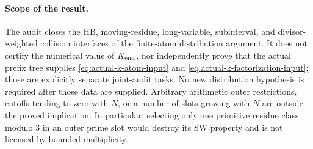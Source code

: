 \paragraph{Scope of the result.}
The audit closes the HB, moving-residue, long-variable, subinterval,
and divisor-weighted collision interfaces of the finite-atom
distribution argument. It does not certify the numerical value of
$K_{\rm end}$, nor independently prove that the actual prefix tree
supplies \eqref{eq:actual-k-atom-input} and
\eqref{eq:actual-k-factorization-input}; those are explicitly separate
joint-audit tasks. No new distribution hypothesis is required after
those data are supplied. Arbitrary arithmetic outer restrictions,
cutoffs tending to zero with $N$, or a number of slots growing with
$N$ are outside the proved implication. In particular, selecting only
one primitive residue class modulo $3$ in an outer prime slot would
destroy its SW property and is not licensed by bounded multiplicity.
